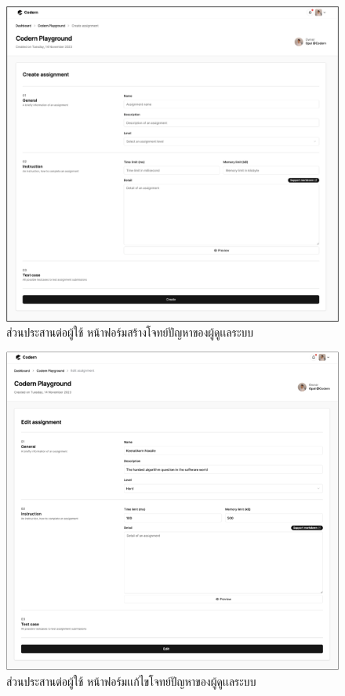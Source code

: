 \documentclass[12pt,oneside,openright,a4paper]{cpe-thai-project}
\begin{document}
    \hypertarget{ui-org-assign2}{
        \begin{figure}[H]
        \centering
            \includegraphics[width=15cm]{figure/ui/ui-assign3.png}
            \caption[ส่วนประสานต่อผู้ใช้ หน้าฟอร์มสร้างโจทย์ปัญหา]{ส่วนประสานต่อผู้ใช้ หน้าฟอร์มสร้างโจทย์ปัญหาของผู้ดูเเลระบบ}
            \label{fig:ui-org-assign2}
        \end{figure}
    }
    \hypertarget{ui-org-assign3}{
        \begin{figure}[H]
        \centering
            \includegraphics[width=15cm]{figure/ui/ui-assign4.png}
            \caption[ส่วนประสานต่อผู้ใช้ หน้าฟอร์มแก้ไขโจทย์ปัญหา]{ส่วนประสานต่อผู้ใช้ หน้าฟอร์มเเก้ไขโจทย์ปัญหาของผู้ดูเเลระบบ}
            \label{fig:ui-org-assign3}
        \end{figure}
    }
    
\end{document}
